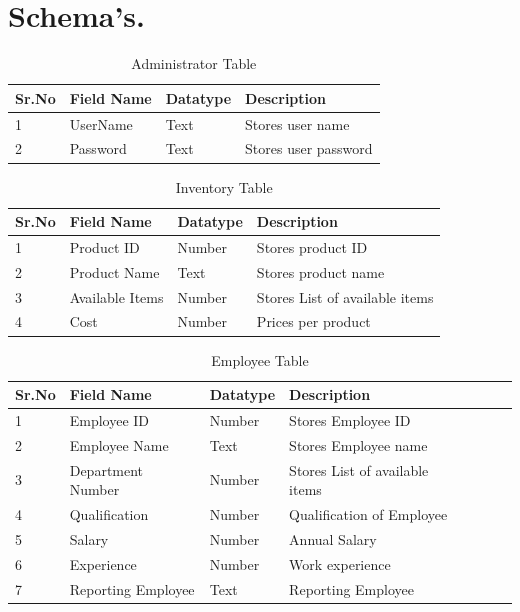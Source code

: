 \documentclass[12pt,a4paper]{report}
\begin{document}
\chapter{Schema's.}%
\begin{table}[ht]
\begin{tabular}{| l | l | l | l |}
\hline
Sr.No & Field Name & Datatype & Description\\ \hline
1 & UserName & Text & Stores user name\\ \hline
2 & Password & Text & Stores user password\\ \hline
\end{tabular}
\caption{Administrator Table}
\end{table}

\begin{table}[ht]
\begin{tabular}{| l | l | l | l |}
\hline
Sr.No & Field Name & Datatype & Description\\ \hline
1 & Product ID & Number & Stores product ID\\ \hline
2 & Product Name & Text & Stores product name\\ \hline
3 & Available Items & Number &  Stores List of available items\\ \hline
4 & Cost & Number & Prices per product \\ \hline
\end{tabular}
\caption{Inventory Table}
\end{table}

\begin{table}[ht]
\begin{tabular}{| l | l | l | l | l | l | l|}
\hline
Sr.No & Field Name & Datatype & Description\\ \hline
1 & Employee ID & Number & Stores Employee ID\\ \hline
2 & Employee Name & Text & Stores Employee name\\ \hline
3 & Department Number & Number &  Stores List of available items\\ \hline
4 & Qualification & Number & Qualification of Employee \\ \hline
5 & Salary & Number & Annual Salary \\ \hline
6 & Experience & Number & Work experience \\ \hline
7 & Reporting Employee & Text & Reporting Employee \\ \hline
\end{tabular}
\caption{Employee Table}
\end{table}
\end{document}
